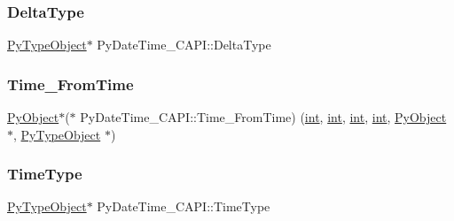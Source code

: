 \mbox{\label{struct_py_date_time___c_a_p_i_a0fb84e80d67fd689d265d94811418231}} 
\subsubsection{\texorpdfstring{DeltaType}{DeltaType}}
{\footnotesize\ttfamily \mbox{\hyperlink{_python27_2object_8h_a42a55dd6e973872c7a6bc61632070f6f}{Py\+Type\+Object}}$\ast$ Py\+Date\+Time\+\_\+\+C\+A\+P\+I\+::\+Delta\+Type}

\mbox{\label{struct_py_date_time___c_a_p_i_a7ab28a3df6cf8503f49553d40a4bdb08}} 
\subsubsection{\texorpdfstring{Time\_FromTime}{Time\_FromTime}}
{\footnotesize\ttfamily \mbox{\hyperlink{_python27_2object_8h_aadc84ac7aed2cfa6f20c25f62bf3dac7}{Py\+Object}}$\ast$($\ast$ Py\+Date\+Time\+\_\+\+C\+A\+P\+I\+::\+Time\+\_\+\+From\+Time) (\mbox{\hyperlink{warnings_8h_a74f207b5aa4ba51c3a2ad59b219a423b}{int}}, \mbox{\hyperlink{warnings_8h_a74f207b5aa4ba51c3a2ad59b219a423b}{int}}, \mbox{\hyperlink{warnings_8h_a74f207b5aa4ba51c3a2ad59b219a423b}{int}}, \mbox{\hyperlink{warnings_8h_a74f207b5aa4ba51c3a2ad59b219a423b}{int}}, \mbox{\hyperlink{_python27_2object_8h_aadc84ac7aed2cfa6f20c25f62bf3dac7}{Py\+Object}} $\ast$, \mbox{\hyperlink{_python27_2object_8h_a42a55dd6e973872c7a6bc61632070f6f}{Py\+Type\+Object}} $\ast$)}

\mbox{\label{struct_py_date_time___c_a_p_i_a14967c0f0703a60b53eee61f3a868c82}} 
\subsubsection{\texorpdfstring{TimeType}{TimeType}}
{\footnotesize\ttfamily \mbox{\hyperlink{_python27_2object_8h_a42a55dd6e973872c7a6bc61632070f6f}{Py\+Type\+Object}}$\ast$ Py\+Date\+Time\+\_\+\+C\+A\+P\+I\+::\+Time\+Type}

